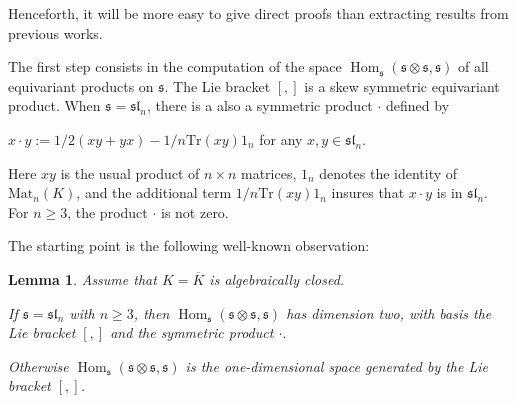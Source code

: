 \documentclass[11pt, letterpaper, reqno]{amsart}
\newtheorem{lemma}[theorem]{Lemma}
\theoremstyle{definition}
\newcommand{\Hom}{\operatorname{Hom}}
\newcommand{\fsl}{\mathfrak{sl}}
\newcommand{\fs}{\mathfrak{s}}
\newcommand{\Mat}{\mathrm{Mat}}
\newcommand{\Tr}{{\mathrm {Tr}}}
\begin{document}
Henceforth, it will be more easy to give direct proofs than extracting results from previous works. 

\bigskip
The first step  consists in the computation 
of the space
$\Hom_\fs(\fs\otimes\fs,\fs)$ 
 of all equivariant products on
$\fs$.  The Lie bracket
$[,]$  is a skew symmetric equivariant product.
When $\fs=\fsl_n$, there is a also a  
symmetric product $\cdot$ defined by

\centerline{$ x\cdot y:=1/2(xy+yx)-1/n\Tr(xy) 1_n$
for any $x, y\in \fsl_n$.}

\noindent Here $xy$ is the usual product of $n\times n$ matrices, $1_n$ denotes the identity of
$\Mat_n(K)$, and the additional term $1/n\Tr(xy) 1_n$ insures that
$x\cdot y$ is in $\fsl_n$. For $n\geq 3$, the product $\cdot$ is not zero.

The starting point is the following 
well-known observation:

\begin{lemma} \label{bilinear} Assume that $K=\overline K$ is algebraically closed.

If $\fs=\fsl_n$ with $n\geq 3$, then
$\Hom_\fs(\fs\otimes\fs,\fs)$ has dimension two,  with basis
the Lie bracket $[,]$ and the symmetric product $\cdot$.

Otherwise $\Hom_\fs(\fs\otimes\fs,\fs)$ is the one-dimensional space generated by the Lie bracket $[,]$.
\end{lemma}
\end{document}
